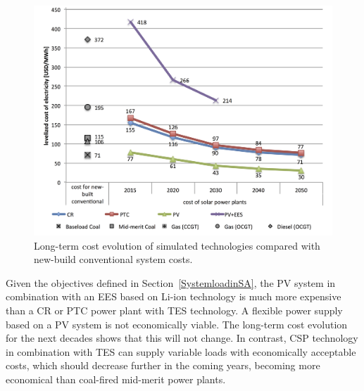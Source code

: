 \begin{figure}[htbp]  
\centering
\includegraphics[width=1\linewidth]{FIG/Costdegrad}
\caption[Long-term cost evolution of simulated technologies compared with new-build conventional system costs.]{Long-term cost evolution of simulated technologies compared with new-build conventional system costs.}\label{Costdegrad}
\end{figure}


Given the objectives defined in Section~\ref{SystemloadinSA}, the PV system in combination with an EES based on Li-ion technology is much more expensive than a CR or PTC power plant with TES technology. A flexible power supply based on a PV system is not economically viable. The long-term cost evolution for the next decades shows that this will not change. In contrast, CSP technology in combination with TES can supply variable loads with economically acceptable costs, which should decrease further in the coming years, becoming more economical than coal-fired mid-merit power plants.